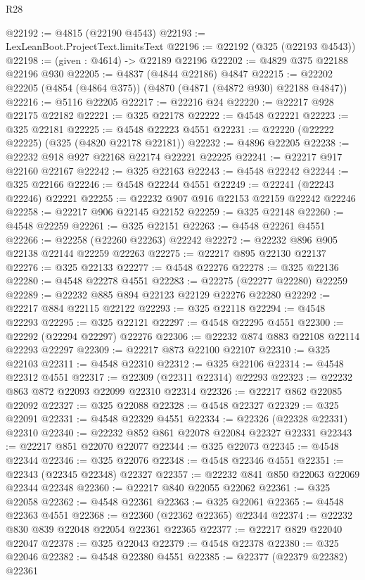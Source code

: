 \begin{lexlean}{R28}
\begin{coremodule}
@22192 := @4815 (@22190 @4543)
@22193 := LexLeanBoot.ProjectText.limitsText
@22196 := @22192 (@325 (@22193 @4543))
@22198 := (given : @4614) -> @22189 @22196
@22202 := @4829 @375 @22188 @22196 @930
@22205 := @4837 (@4844 @22186) @4847
@22215 := @22202 @22205 (@4854 (@4864 @375)) (@4870 (@4871 (@4872 @930) @22188 @4847))
@22216 := @5116 @22205
@22217 := @22216 @24
@22220 := @22217 @928 @22175 @22182
@22221 := @325 @22178
@22222 := @4548 @22221
@22223 := @325 @22181
@22225 := @4548 @22223 @4551
@22231 := @22220 (@22222 @22225) (@325 (@4820 @22178 @22181))
@22232 := @4896 @22205
@22238 := @22232 @918 @927 @22168 @22174 @22221 @22225
@22241 := @22217 @917 @22160 @22167
@22242 := @325 @22163
@22243 := @4548 @22242
@22244 := @325 @22166
@22246 := @4548 @22244 @4551
@22249 := @22241 (@22243 @22246) @22221
@22255 := @22232 @907 @916 @22153 @22159 @22242 @22246
@22258 := @22217 @906 @22145 @22152
@22259 := @325 @22148
@22260 := @4548 @22259
@22261 := @325 @22151
@22263 := @4548 @22261 @4551
@22266 := @22258 (@22260 @22263) @22242
@22272 := @22232 @896 @905 @22138 @22144 @22259 @22263
@22275 := @22217 @895 @22130 @22137
@22276 := @325 @22133
@22277 := @4548 @22276
@22278 := @325 @22136
@22280 := @4548 @22278 @4551
@22283 := @22275 (@22277 @22280) @22259
@22289 := @22232 @885 @894 @22123 @22129 @22276 @22280
@22292 := @22217 @884 @22115 @22122
@22293 := @325 @22118
@22294 := @4548 @22293
@22295 := @325 @22121
@22297 := @4548 @22295 @4551
@22300 := @22292 (@22294 @22297) @22276
@22306 := @22232 @874 @883 @22108 @22114 @22293 @22297
@22309 := @22217 @873 @22100 @22107
@22310 := @325 @22103
@22311 := @4548 @22310
@22312 := @325 @22106
@22314 := @4548 @22312 @4551
@22317 := @22309 (@22311 @22314) @22293
@22323 := @22232 @863 @872 @22093 @22099 @22310 @22314
@22326 := @22217 @862 @22085 @22092
@22327 := @325 @22088
@22328 := @4548 @22327
@22329 := @325 @22091
@22331 := @4548 @22329 @4551
@22334 := @22326 (@22328 @22331) @22310
@22340 := @22232 @852 @861 @22078 @22084 @22327 @22331
@22343 := @22217 @851 @22070 @22077
@22344 := @325 @22073
@22345 := @4548 @22344
@22346 := @325 @22076
@22348 := @4548 @22346 @4551
@22351 := @22343 (@22345 @22348) @22327
@22357 := @22232 @841 @850 @22063 @22069 @22344 @22348
@22360 := @22217 @840 @22055 @22062
@22361 := @325 @22058
@22362 := @4548 @22361
@22363 := @325 @22061
@22365 := @4548 @22363 @4551
@22368 := @22360 (@22362 @22365) @22344
@22374 := @22232 @830 @839 @22048 @22054 @22361 @22365
@22377 := @22217 @829 @22040 @22047
@22378 := @325 @22043
@22379 := @4548 @22378
@22380 := @325 @22046
@22382 := @4548 @22380 @4551
@22385 := @22377 (@22379 @22382) @22361

\end{coremodule}
\end{lexlean}
